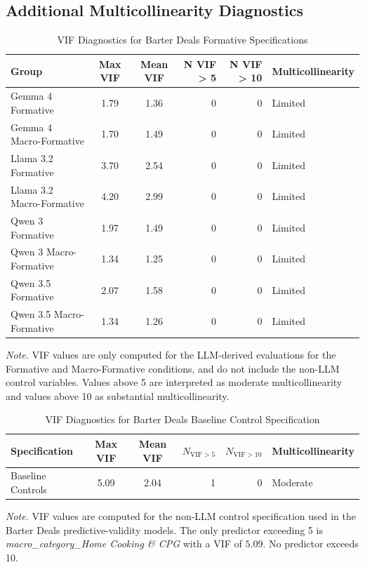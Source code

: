 

\subsection{Additional Multicollinearity Diagnostics}\label{app:vif_diagnostics}

\begin{table}
    \caption{VIF Diagnostics for Barter Deals Formative Specifications}
    \label{tab:VIF_barter}
    \begin{tabular}{lccrrl}
    \toprule
    Group & Max VIF & Mean VIF & N VIF > 5 & N VIF > 10 & Multicollinearity \\
    \midrule
    Gemma 4 Formative & 1.79 & 1.36 & 0 & 0 & Limited \\
    Gemma 4 Macro-Formative & 1.70 & 1.49 & 0 & 0 & Limited \\
    Llama 3.2 Formative & 3.70 & 2.54 & 0 & 0 & Limited \\
    Llama 3.2 Macro-Formative & 4.20 & 2.99 & 0 & 0 & Limited \\
    Qwen 3 Formative & 1.97 & 1.49 & 0 & 0 & Limited \\
    Qwen 3 Macro-Formative & 1.34 & 1.25 & 0 & 0 & Limited \\
    Qwen 3.5 Formative & 2.07 & 1.58 & 0 & 0 & Limited \\
    Qwen 3.5 Macro-Formative & 1.34 & 1.26 & 0 & 0 & Limited \\
    \bottomrule
    \end{tabular}

    \begin{flushleft}
    \footnotesize
    \textit{Note.} VIF values are only computed for the LLM-derived evaluations for the Formative and Macro-Formative conditions, and do not include the non-LLM control variables. Values above 5 are interpreted as moderate multicollinearity and values above 10 as substantial multicollinearity.
    \end{flushleft}
\end{table}


\begin{table}
\centering
\caption{VIF Diagnostics for Barter Deals Baseline Control Specification}
\label{tab:VIF_barter_controls}
\begin{tabular}{lccrrl}
\toprule
Specification & Max VIF & Mean VIF & $N_{\mathrm{VIF}>5}$ & $N_{\mathrm{VIF}>10}$ & Multicollinearity \\
\midrule
Baseline Controls & 5.09 & 2.04 & 1 & 0 & Moderate \\
\bottomrule
\end{tabular}

\begin{flushleft}
\footnotesize
\textit{Note.} VIF values are computed for the non-LLM control specification used in the Barter Deals predictive-validity models. The only predictor exceeding 5 is \textit{macro\_category\_Home Cooking \& CPG} with a VIF of $5.09$. No predictor exceeds 10.
\end{flushleft}
\end{table}






